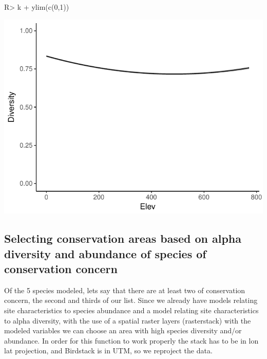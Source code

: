\documentclass[article]{jss}
\begin{document}
\begin{CodeChunk}
\begin{CodeInput}
R> k + ylim(c(0,1))
\end{CodeInput}


\begin{center}\includegraphics{diversityocc_files/figure-latex/unnamed-chunk-26-3} \end{center}

\end{CodeChunk}

\subsection{Selecting conservation areas based on alpha diversity and
abundance of species of conservation
concern}\label{selecting-conservation-areas-based-on-alpha-diversity-and-abundance-of-species-of-conservation-concern}

Of the 5 species modeled, lets say that there are at least two of
conservation concern, the second and thirds of our list. Since we
already have models relating site characteristics to species abundance
and a model relating site characteristics to alpha diversity, with the
use of a spatial raster layers (rasterstack) with the modeled variables
we can choose an area with high species diversity and/or abundance. In
order for this function to work properly the stack has to be in lon lat
projection, and Birdstack is in UTM, so we reproject the data.
\end{document}
